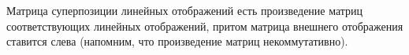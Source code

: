 \begin{utverzhd}
	Матрица суперпозиции линейных отображений есть произведение матриц соответствующих линейных отображений, притом матрица внешнего отображения ставится слева (напомним, что произведение матриц некоммутативно).
\end{utverzhd}



